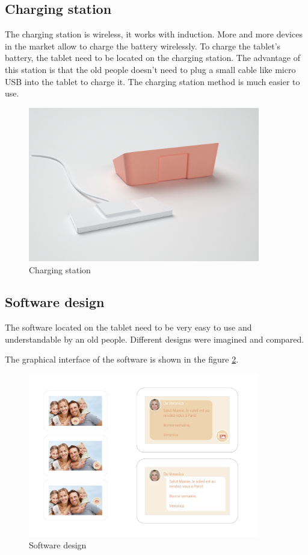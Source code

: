 \subsection{Charging station}

The charging station is wireless, it works with induction. More and more devices in the market allow to charge the battery wirelessly. To charge the tablet's battery, the tablet need to be located on the charging station. The advantage of this station is that the old people doesn't need to plug a small cable like micro USB into the tablet to charge it. The charging station method is much easier to use.

\begin{figure}[!htb]
    \centering
    \includegraphics[width=0.9\textwidth,keepaspectratio]{chap/designFig/VisioRender7.png}
    \caption{Charging station}
    \label{fig:charging station}
\end{figure}

\clearpage

\subsection{Software design}

The software located on the tablet need to be very easy to use and understandable by an old people. Different designs were imagined and compared.

The graphical interface of the software is shown in the figure \ref{fig:soft design}.

\begin{figure}[!htb]
    \centering
    \includegraphics[width=0.9\textwidth,keepaspectratio]{chap/designFig/vesta_design.jpg}
    \caption{Software design}
    \label{fig:soft design}
\end{figure}
